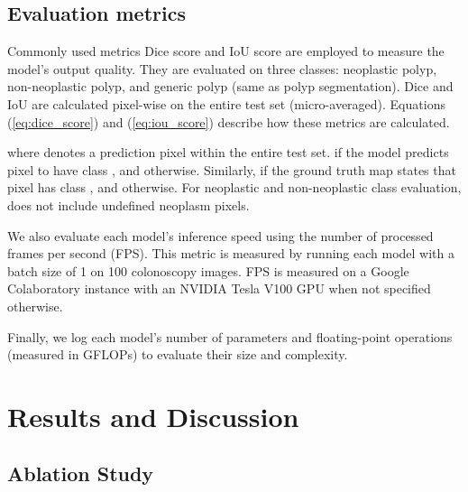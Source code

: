 \documentclass{ieeeaccess}
\begin{document}
\subsection{Evaluation metrics}
Commonly used metrics Dice score and IoU score are employed to measure the model's output quality. They are evaluated on three classes: neoplastic polyp, non-neoplastic polyp, and generic polyp (same as polyp segmentation). Dice and IoU are calculated pixel-wise on the entire test set (micro-averaged). Equations (\ref{eq:dice_score}) and (\ref{eq:iou_score}) describe how these metrics are calculated.




where  denotes a prediction pixel within the entire test set.  if the model predicts pixel  to have class , and  otherwise. Similarly,  if the ground truth map states that pixel  has class , and  otherwise. For neoplastic and non-neoplastic class evaluation,  does not include undefined neoplasm pixels.

We also evaluate each model's inference speed using the number of processed frames per second (FPS). This metric is measured by running each model with a batch size of 1 on 100 colonoscopy images. FPS is measured on a Google Colaboratory instance with an NVIDIA Tesla V100 GPU when not specified otherwise.

Finally, we log each model's number of parameters and floating-point operations (measured in GFLOPs) to evaluate their size and complexity.

\section{Results and Discussion}
\subsection{Ablation Study}
\end{document}
